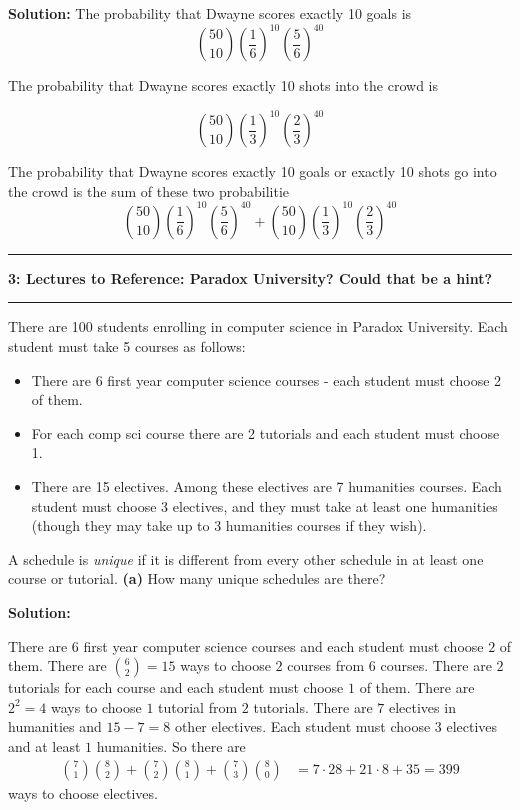 \documentclass[11pt]{article}
\newcommand\question[2]{\vspace{.25in}\hrule\textbf{#1: #2}\vspace{.5em}\hrule\vspace{.10in}}
\renewcommand\part[1]{\vspace{.10in}\textbf{(#1)}}
\newcommand{\solution}{\vspace{.10in}\textbf{Solution: }}
\begin{document}
\solution
The probability that Dwayne scores exactly 10 goals is 
\[
\binom{50}{10} \left(\frac{1}{6}\right)^{10} \left(\frac{5}{6}\right)^{40} 
\]

The probability that Dwayne scores exactly 10 shots into the crowd is

\[
\binom{50}{10} \left(\frac{1}{3}\right)^{10} \left(\frac{2}{3}\right)^{40}
\]

The probability that Dwayne scores exactly 10 goals or exactly 10 shots go into the crowd is the sum of these two probabilitie
\[
\binom{50}{10} \left(\frac{1}{6}\right)^{10} \left(\frac{5}{6}\right)^{40} + \binom{50}{10} \left(\frac{1}{3}\right)^{10} \left(\frac{2}{3}\right)^{40}
\]

\question{3}{Lectures to Reference: Paradox University? Could that be a hint?}
There are 100 students enrolling in computer science in Paradox University. Each student must take 5 courses as follows:
\begin{itemize}
\item There are 6 first year computer science courses - each student must choose 2 of them.
\item For each comp sci course there are 2 tutorials and each student must choose 1.
\item There are 15 electives. Among these electives are 7 humanities courses. Each student must choose 3 electives, and they must take at least one humanities (though they may take up to 3 humanities courses if they wish).
\end{itemize}

A schedule is \textit{unique} if it is different from every other schedule in at least one course or tutorial.
\part{a} How many unique schedules are there?

\solution

There are $6$ first year computer science courses and each student must choose $2$ of them. There are $\binom{6}{2} = 15$ ways to choose $2$ courses from $6$ courses.
There are $2$ tutorials for each course and each student must choose $1$ of them. There are $2^2 = 4$ ways to choose $1$ tutorial from $2$ tutorials.
There are $7$ electives in humanities and $15-7=8$ other electives. Each student must choose $3$ electives and at least $1$ humanities.
So there are
\begin{align*}
  \binom{7}{1}\binom{8}{2} + \binom{7}{2}\binom{8}{1} + \binom{7}{3}\binom{8}{0} &= 7\cdot 28 + 21\cdot 8 + 35 = 399
\end{align*}
ways to choose electives.
\end{document}
